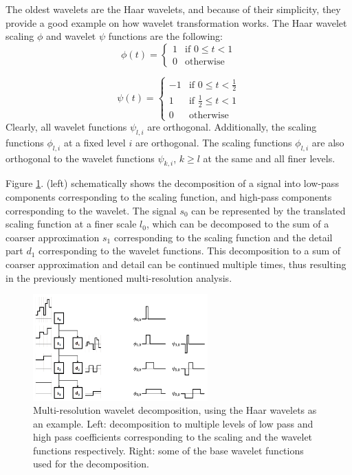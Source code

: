 The oldest wavelets are the Haar wavelets, and because of their simplicity, they provide a good example on how wavelet transformation works. The Haar wavelet scaling $\phi$ and wavelet $\psi$ functions are the following:
\begin{equation}
\phi(t) = 
\begin{cases}
    1 & \text{if } 0 \leq t < 1 \\
    0 & \text{otherwise}
\end{cases}
\label{eq:scaling}
\end{equation}

\begin{equation}
\psi(t) = 
\begin{cases}
    -1 & \text{if } 0 \leq t < \frac{1}{2} \\
    1 & \text{if } \frac{1}{2} \leq t < 1 \\
    0 & \text{otherwise}
\end{cases}
\label{eq:wavelet}
\end{equation}
Clearly, all wavelet functions $\psi_{l,i}$ are orthogonal. Additionally, the scaling functions $\phi_{l,i}$ at a fixed level $i$ are orthogonal. The scaling functions $\phi_{l,i}$ are also orthogonal to the wavelet functions $\psi_{k,i}$, $k \geq l$ at the same and all finer levels.

Figure \ref{fig:wavelet}. (left) schematically shows the decomposition of a signal into low-pass components corresponding to the scaling function, and high-pass components corresponding to the wavelet. The signal $s_0$ can be represented by the translated scaling function at a finer scale $l_0$, which can be decomposed to the sum of a coarser approximation $s_1$ corresponding to the scaling function and the detail part $d_1$ corresponding to the wavelet functions. This decomposition to a sum of coarser approximation and detail can be continued multiple times, thus resulting in the previously mentioned multi-resolution analysis.


\begin{figure}
\centering
\includegraphics[width=0.6\textwidth]{wavelet}
\caption{Multi-resolution wavelet decomposition, using the Haar wavelets as an example. Left: decomposition to multiple levels of low pass and high pass coefficients corresponding to the scaling and the wavelet functions respectively. Right: some of the base wavelet functions used for the decomposition.}
\label{fig:wavelet}
\end{figure}


